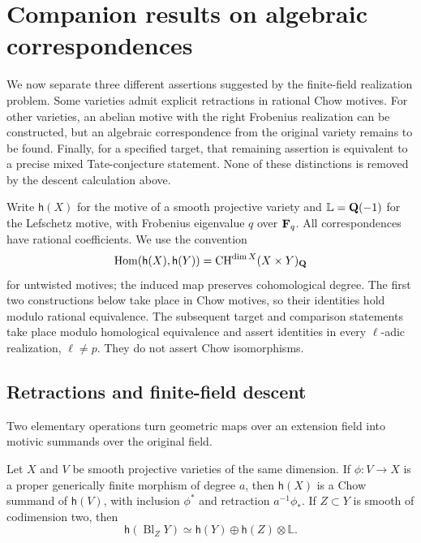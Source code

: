 \section{Companion results on algebraic correspondences}\label{sec:companion}

We now separate three different assertions suggested by the finite-field
realization problem. Some varieties admit explicit retractions in
rational Chow motives. For other varieties, an abelian motive with the
right Frobenius realization can be constructed, but an algebraic
correspondence from the original variety remains to be found. Finally,
for a specified target, that remaining assertion is equivalent to a
precise mixed Tate-conjecture statement. None of these distinctions is
removed by the descent calculation above.

Write $\mathsf h(X)$ for the motive of a smooth projective variety and
$\mathbb L=\mathbf Q(-1)$ for the Lefschetz motive, with Frobenius eigenvalue
$q$ over $\mathbf F_q$. All correspondences have rational coefficients.
We use the convention
\[
 \operatorname{Hom}(\mathsf h(X),\mathsf h(Y))
       =\operatorname{CH}^{\dim X}(X\times Y)_{\mathbf Q}
\]
for untwisted motives; the induced map preserves cohomological degree.
The first two constructions below take place in Chow motives, so their
identities hold modulo rational equivalence. The subsequent target and
comparison statements take place modulo homological equivalence and
assert identities in every $\ell$-adic realization, $\ell\ne p$.
They do not assert Chow isomorphisms.

\subsection{Retractions and finite-field descent}

Two elementary operations turn geometric maps over an extension
field into motivic summands over the original field.

\begin{lemma}\label{lem:retractions}
Let $X$ and $V$ be smooth projective varieties of the same dimension.
If $\phi:V\to X$ is a proper generically finite morphism of degree $a$,
then $\mathsf h(X)$ is a Chow summand of $\mathsf h(V)$, with inclusion
$\phi^*$ and retraction $a^{-1}\phi_*$. If $Z\subset Y$ is smooth of
codimension two, then
\[
 \mathsf h(\operatorname{Bl}_Z Y)
       \simeq \mathsf h(Y)\oplus\mathsf h(Z)\otimes\mathbb L.
\]
\end{lemma}

